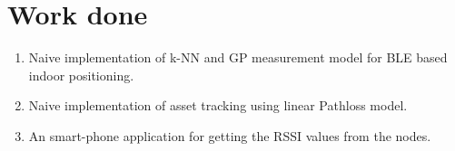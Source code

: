 \section{Work done}

\begin{enumerate}
\item Naive implementation of k-NN and GP measurement model for BLE based indoor positioning\cite{ble-ip-proj}.
\item Naive implementation of asset tracking using linear Pathloss model.
\item An smart-phone application for getting the RSSI values from the nodes. 
\end{enumerate}
